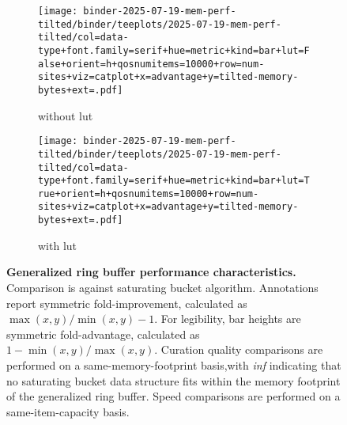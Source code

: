 \begin{figure*}

\begin{subfigure}{\textwidth}
\texttt{[image: binder-2025-07-19-mem-perf-tilted/binder/teeplots/2025-07-19-mem-perf-tilted/col=data-type+font.family=serif+hue=metric+kind=bar+lut=False+orient=h+qosnumitems=10000+row=num-sites+viz=catplot+x=advantage+y=tilted-memory-bytes+ext=.pdf]}
\caption{without lut}
\label{fig:mem-perf-tilted:nolut}
\end{subfigure}

\begin{subfigure}{\textwidth}
\texttt{[image: binder-2025-07-19-mem-perf-tilted/binder/teeplots/2025-07-19-mem-perf-tilted/col=data-type+font.family=serif+hue=metric+kind=bar+lut=True+orient=h+qosnumitems=10000+row=num-sites+viz=catplot+x=advantage+y=tilted-memory-bytes+ext=.pdf]}
\caption{with lut}
\label{fig:mem-perf-tilted:lut}
\end{subfigure}

\caption{
\textbf{Generalized ring buffer performance characteristics.}
\footnotesize
Comparison is against saturating bucket algorithm.
Annotations report symmetric fold-improvement, calculated as $\max(x, y) / \min(x, y) - 1$.
For legibility, bar heights are symmetric fold-advantage, calculated as $1 - \min(x, y) / \max(x, y)$.
Curation quality comparisons are performed on a same-memory-footprint basis,with \textit{inf} indicating that no saturating bucket data structure fits within the memory footprint of the generalized ring buffer.
Speed comparisons are performed on a same-item-capacity basis.
}
\label{fig:mem-perf-tilted}

\end{figure*}
